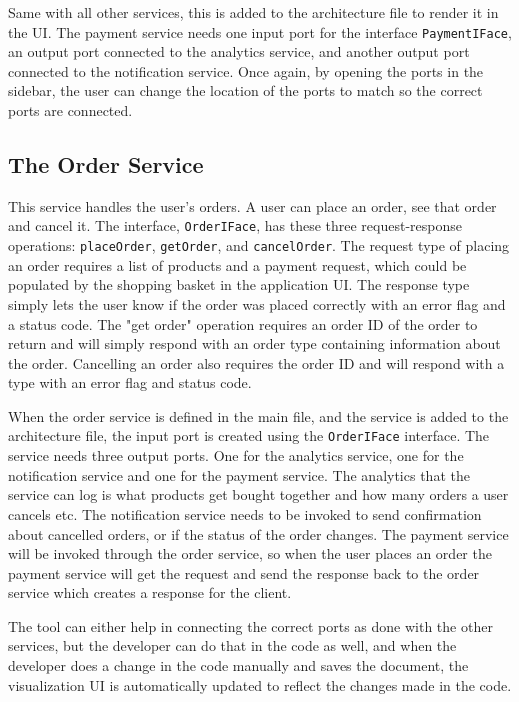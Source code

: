 Same with all other services, this is added to the architecture file to render it in the UI. The payment service needs one input port for the interface \texttt{PaymentIFace}, an output port connected to the analytics service, and another output port connected to the notification service.
Once again, by opening the ports in the sidebar, the user can change the location of the ports to match so the correct ports are connected.

\subsection{The Order Service}
This service handles the user's orders. A user can place an order, see that order and cancel it. The interface, \texttt{OrderIFace}, has these three request-response operations: \texttt{placeOrder}, \texttt{getOrder}, and \texttt{cancelOrder}.
The request type of placing an order requires a list of products and a payment request, which could be populated by the shopping basket in the application UI.
The response type simply lets the user know if the order was placed correctly with an error flag and a status code. The "get order" operation requires an order ID of the order to return and will simply respond with an order type containing information about the order.
Cancelling an order also requires the order ID and will respond with a type with an error flag and status code.

When the order service is defined in the main file, and the service is added to the architecture file, the input port is created using the \texttt{OrderIFace} interface.
The service needs three output ports. One for the analytics service, one for the notification service and one for the payment service. The analytics that the service can log is what products get bought together and how many orders a user cancels etc.
The notification service needs to be invoked to send confirmation about cancelled orders, or if the status of the order changes.
The payment service will be invoked through the order service, so when the user places an order the payment service will get the request and send the response back to the order service which creates a response for the client.

The tool can either help in connecting the correct ports as done with the other services, but the developer can do that in the code as well, and when the developer does a change in the code manually and saves the document, the visualization UI is automatically updated to reflect the changes made in the code.

